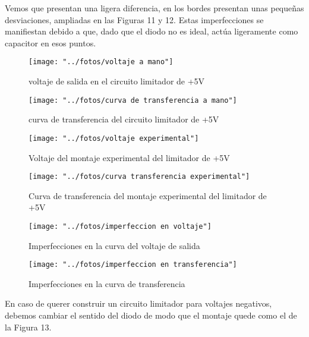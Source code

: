 \documentclass[a4paper,12pt,spanish]{article}
\begin{document}
Vemos que presentan una ligera diferencia, en los bordes presentan unas pequeñas desviaciones, ampliadas en las Figuras 11 y 12. Estas imperfecciones se manifiestan debido a que, dado que el diodo no es ideal, actúa ligeramente como capacitor en esos puntos.

\begin{figure}[H]
	\centering
	\texttt{[image: "../fotos/voltaje a mano"]}
	\caption{voltaje de salida en el circuito limitador de +5V}
	\label{fig:voltaje-a-mano}
\end{figure}

\begin{figure}[H]
	\centering
	\texttt{[image: "../fotos/curva de transferencia a mano"]}
	\caption{curva de transferencia del circuito limitador de +5V}
	\label{fig:curva-de-transferencia-a-mano}
\end{figure}


\begin{figure}[H]
	\centering
	\texttt{[image: "../fotos/voltaje experimental"]}
	\caption{Voltaje del montaje experimental del limitador de +5V}
	\label{fig:voltaje-experimental}
\end{figure}

\begin{figure}[H]
	\centering
	\texttt{[image: "../fotos/curva transferencia experimental"]}
	\caption{Curva de transferencia del montaje experimental del limitador de +5V}
	\label{fig:curva-transferencia-experimental}
\end{figure}

\begin{figure}[H]
	\centering
	\texttt{[image: "../fotos/imperfeccion en voltaje"]}
	\caption{Imperfecciones en la curva del voltaje de salida}
	\label{fig:imperfeccion-en-voltaje}
\end{figure}

\begin{figure}[H]
	\centering
	\texttt{[image: "../fotos/imperfeccion en transferencia"]}
	\caption{Imperfecciones en la curva de transferencia}
	\label{fig:imperfeccion-en-transferencia}
\end{figure}



En caso de querer construir un circuito limitador para voltajes negativos, debemos cambiar el sentido del diodo de modo que el montaje quede como el de la Figura 13.
\end{document}
